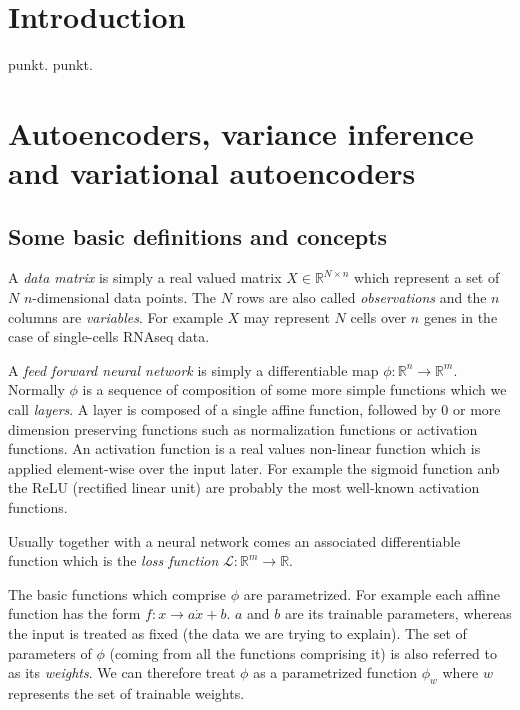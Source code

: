 \documentclass[11pt, a4paper]{report}
\theoremstyle{plain}
\theoremstyle{definition}
\newtheorem{mydef}{Definition}[chapter]
\theoremstyle{remark}
\newcommand{\R}{\mathbb{R}}
\begin{document}
\listoftables

\listoffigures

\tableofcontents

\chapter{Introduction}
punkt.
punkt.

\chapter{Autoencoders, variance inference and variational autoencoders}

\section{Some basic definitions and concepts}
A \textit{data matrix} is simply a real valued matrix $X \in \R^{N \times n}$
which represent a set of $N$ $n$-dimensional data points.
The $N$ rows are also called \textit{observations} and the $n$ columns are
\textit{variables}.
For example $X$ may represent $N$ cells over $n$ genes in the case of
single-cells RNAseq data.

A \textit{feed forward neural network} is simply a differentiable map $\phi :
\R^n \to \R^m$.
Normally $\phi$ is a sequence of composition of some more simple functions which
we call \textit{layers}. A layer is composed of a single affine function,
followed by $0$ or more dimension preserving functions such as normalization
functions or activation functions. An activation function is a real values
non-linear function which is applied element-wise over the input later.
For example the sigmoid function anb the ReLU (rectified linear unit) are
probably the most well-known activation functions.


Usually together with a neural network comes an associated differentiable
function which is the \textit{loss function} $\mathcal{L} : \R^m \to \R$.

The basic functions which comprise $\phi$ are parametrized. For example each
affine function has the form $f:x \to a\dot x + b$. $a$ and $b$ are its
trainable parameters, whereas the input is treated as fixed (the data we are
trying to explain). The set of parameters of $\phi$ (coming from all the
functions comprising it) is also referred to as its \textit{weights}. We can
therefore treat $\phi$ as a parametrized function $\phi_w$ where $w$ represents
the set of trainable weights.
\end{document}
